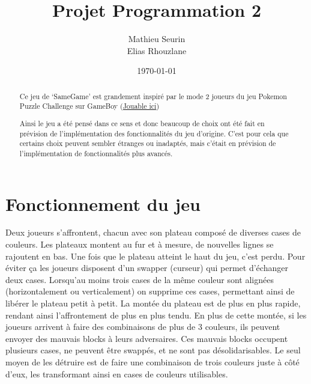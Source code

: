 \documentclass[]{article}
\date{}
\begin{document}
\title{Projet Programmation 2}
\author{Mathieu Seurin \\
Elias Rhouzlane}
\date{\today}
 
\maketitle
\begin{abstract}
Ce jeu de ‘SameGame’ est grandement inspiré par le mode 2 joueurs du jeu Pokemon Puzzle
Challenge sur GameBoy (\href{http://www.playr.org/play/pokemon_puzzle_challenge/1366}{Jouable ici})

Ainsi le jeu a été pensé dans ce sens et donc beaucoup de choix ont été fait en prévision de
l’implémentation des fonctionnalités du jeu d’origine. C’est pour cela que certains choix peuvent
sembler étranges ou inadaptés, mais c’était en prévision de l’implémentation de fonctionnalités plus
avancés.
\end{abstract}
\section*{Fonctionnement du jeu}
Deux joueurs s’affrontent, chacun avec son plateau composé de diverses cases de couleurs. Les
plateaux montent au fur et à mesure, de nouvelles lignes se rajoutent en bas. Une fois que le plateau
atteint le haut du jeu, c’est perdu. Pour éviter ça les joueurs disposent d’un swapper (curseur) qui
permet d’échanger deux cases. Lorsqu’au moins trois cases de la même couleur sont alignées
(horizontalement ou verticalement) on supprime ces cases, permettant ainsi de libérer le plateau
petit à petit. La montée du plateau est de plus en plus rapide, rendant ainsi l’affrontement de plus en
plus tendu. En plus de cette montée, si les joueurs arrivent à faire des combinaisons de plus de 3
couleurs, ils peuvent envoyer des mauvais blocks à leurs adversaires. Ces mauvais blocks occupent
plusieurs cases, ne peuvent être swappés, et ne sont pas désolidarisables. Le seul moyen de les
détruire est de faire une combinaison de trois couleurs juste à côté d’eux, les transformant ainsi en
cases de couleurs utilisables.
\pagebreak
\end{document}
